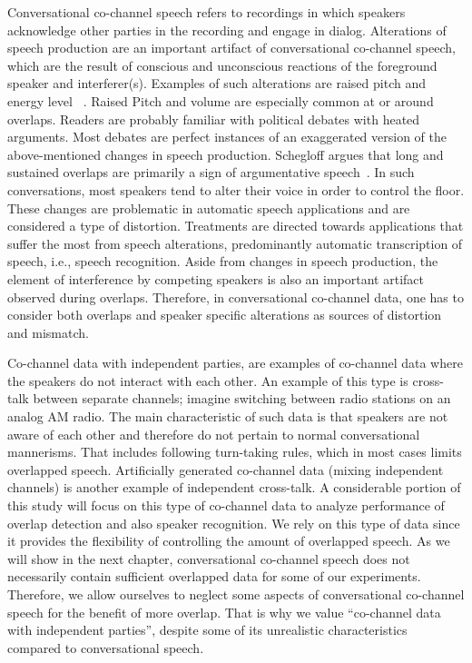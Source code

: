Conversational co-channel speech refers to recordings in which speakers acknowledge other parties in the recording and engage in dialog. 
Alterations of speech production are an important artifact of conversational co-channel speech, which are the result of conscious and unconscious reactions of the foreground speaker and interferer(s). 
Examples of such alterations are raised pitch and energy level ~\cite{Shriberg01observationson,schegloff2000overlapping}. 
Raised Pitch and volume are especially common at or around overlaps. 
Readers are probably familiar with political debates with heated arguments. 
Most debates are perfect instances of an exaggerated version of the above-mentioned changes in speech production. 
Schegloff argues that long and sustained overlaps are primarily a sign of argumentative speech~\cite{schegloff2000overlapping}. 
In such conversations, most speakers tend to alter their voice in order to control the floor. 
These changes are problematic in automatic speech applications and are considered a type of distortion. 
Treatments are directed towards applications that suffer the most from speech alterations, predominantly automatic transcription of speech, i.e., speech recognition. 
Aside from changes in speech production, the element of interference by competing speakers is also an important artifact observed during overlaps. 
Therefore, in conversational co-channel data, one has to consider both overlaps and speaker specific alterations as sources of distortion and mismatch. 

Co-channel data with independent parties, are examples of co-channel data where the speakers do not interact with each other. 
An example of this type is cross-talk between separate channels; imagine switching between radio stations on an analog AM radio. 
The main characteristic of such data is that speakers are not aware of each other and therefore do not pertain to normal conversational mannerisms. 
That includes following turn-taking rules, which in most cases limits overlapped speech. 
Artificially generated co-channel data (mixing independent channels) is another example of independent cross-talk. 
A considerable portion of this study will focus on this type of co-channel data to analyze performance of overlap detection and also speaker recognition. 
We rely on this type of data since it provides the flexibility of controlling the amount of overlapped speech. 
As we will show in the next chapter, conversational co-channel speech does not necessarily contain sufficient overlapped data for some of our experiments. 
Therefore, we allow ourselves to neglect some aspects of conversational co-channel speech for the benefit of more overlap. 
That is why we value ``co-channel data with independent parties'', despite some of its unrealistic characteristics compared to conversational speech. 


